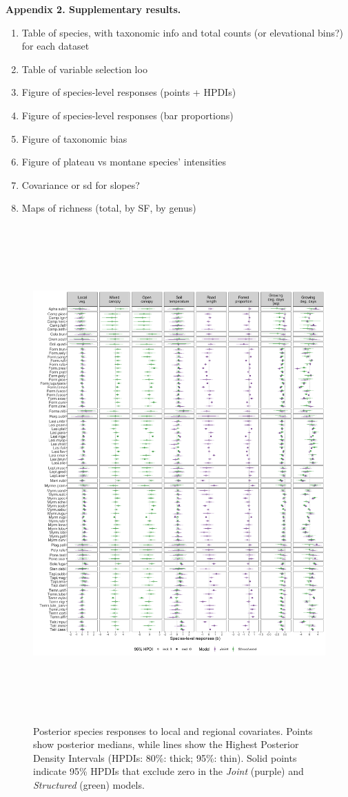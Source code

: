 \documentclass[preprint,review,times,12pt]{elsarticle}
\begin{document}
\textbf{Appendix 2. Supplementary results.}
\begin{enumerate}
    \item Table of species, with taxonomic info and total counts (or elevational bins?) for each dataset
    \item Table of variable selection loo
    \item Figure of species-level responses (points + HPDIs)
    \item Figure of species-level responses (bar proportions)
    \item Figure of taxonomic bias
    \item Figure of plateau vs montane species' intensities
    \item Covariance or sd for slopes?
    \item Maps of richness (total, by SF, by genus)
\end{enumerate}

\begin{figure}
	\centering\includegraphics[height=7.5in]{ms/1_Ecography/1/figs/b_opt_byParam.png}
	\caption{\label{fig:b_byParam} Posterior species responses to local and regional covariates. Points show posterior medians, while lines show the Highest Posterior Density Intervals (HPDIs: 80\%: thick; 95\%: thin). Solid points indicate 95\% HPDIs that exclude zero in the \emph{Joint} (purple) and \emph{Structured} (green) models.}
\end{figure}
\end{document}
